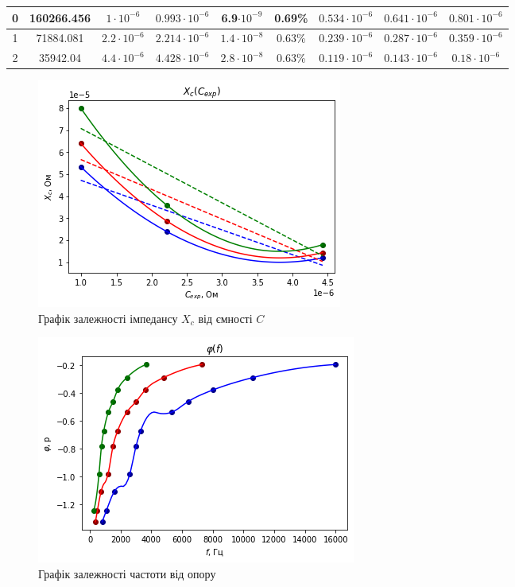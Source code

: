 \documentclass[a4paper,12pt]{article}
\begin{document}
\begin{justify}
\begin{table}[htp]
\begin{adjustwidth}{-0.9cm}{}
\begin{tabular}{|c|c|c|c|c|c|c|c|c|}
0 & 160266.456 & $1\cdot10^{-6}$   & $0.993\cdot10^{-6}$ & 6.9$\cdot10^{-9}$ & 0.69\%          & $0.534\cdot10^{-6}$ & $0.641\cdot10^{-6}$ & $0.801\cdot10^{-6}$ \\ \hline
1 & 71884.081   & $2.2\cdot10^{-6}$ & $2.214\cdot10^{-6}$ & $1.4\cdot10^{-8}$ & 0.63\%          & $0.239\cdot10^{-6}$ & $0.287\cdot10^{-6}$ & $0.359\cdot10^{-6}$ \\ \hline
2 & 35942.04  & $4.4\cdot10^{-6}$ & $4.428\cdot10^{-6}$ & $2.8\cdot10^{-8}$ & 0.63\%          & $0.119\cdot10^{-6}$ & $0.143\cdot10^{-6}$ & $0.18\cdot10^{-6}$  \\ \hline
\end{tabular}
\end{adjustwidth}
\end{table}
	\begin{figure}[h!]
		\begin{center}
			\includegraphics[scale=0.8]{media/graph14a}
		\end{center}
		\caption{Графік залежності імпедансу $X_c$ від ємності $C$}
		\label{Picture_2}
	\end{figure}\newpage
   
\begin{figure}[h!]
		\begin{center}
			\includegraphics[scale=0.8]{media/graph15a}
		\end{center}
		\caption{Графік залежності частоти від опору}
		\label{Picture_е}
	\end{figure}
	

\end{justify}
\end{document}
